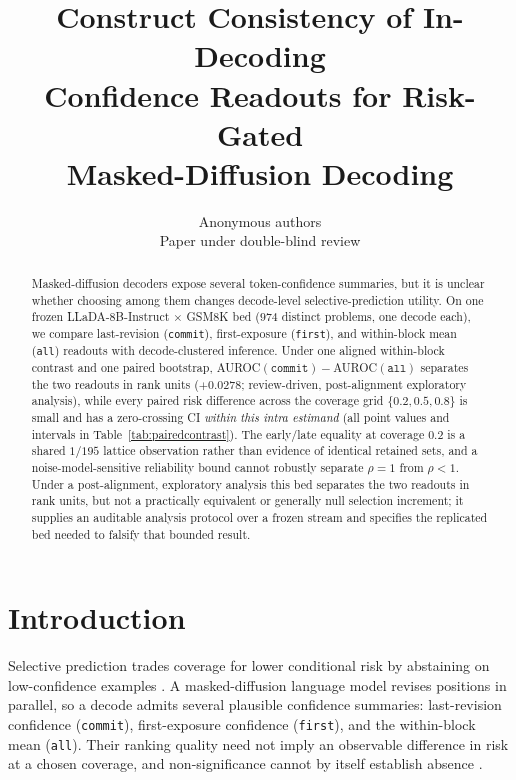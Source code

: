 \documentclass{article}
\title{Construct Consistency of In-Decoding\\
Confidence Readouts for Risk-Gated\\
Masked-Diffusion Decoding}
\author{Anonymous authors\\
Paper under double-blind review}
\begin{document}
\maketitle

\begin{abstract}
Masked-diffusion decoders expose several token-confidence summaries, but it is unclear whether
choosing among them changes decode-level selective-prediction utility.  On one frozen
LLaDA-8B-Instruct $\times$ GSM8K bed ($974$ distinct problems, one decode each), we compare
last-revision (\texttt{commit}), first-exposure (\texttt{first}), and within-block mean
(\texttt{all}) readouts with decode-clustered inference.  Under one aligned within-block contrast
and one paired bootstrap, AUROC$(\texttt{commit})-$AUROC$(\texttt{all})$ separates the two
readouts in rank units ($+0.0278$; review-driven, post-alignment exploratory analysis), while
every paired risk difference across the coverage grid $\{0.2,0.5,0.8\}$ is small and has a
zero-crossing CI \emph{within this intra estimand} (all point values and intervals in
Table~\ref{tab:pairedcontrast}).  The early/late equality at coverage $0.2$ is a shared
$1/195$ lattice observation rather than evidence of identical retained sets, and a
noise-model-sensitive reliability bound cannot robustly separate $\rho=1$ from $\rho<1$.
Under a post-alignment, exploratory analysis this bed separates the two readouts in rank units,
but not a practically equivalent or generally null selection increment; it supplies an
auditable analysis protocol over a frozen stream and specifies the replicated bed needed to
falsify that bounded result.
\end{abstract}

\section{Introduction}
\label{sec:intro}

Selective prediction trades coverage for lower conditional risk by abstaining on low-confidence
examples \citep{chow1970character,elyaniv2010foundations,bartlett2008classification,
geifman2017selective}.  A masked-diffusion language model revises positions in parallel, so a
decode admits several plausible confidence summaries: last-revision confidence
(\texttt{commit}), first-exposure confidence (\texttt{first}), and the within-block mean
(\texttt{all}).  Their ranking quality need not imply an observable difference in risk at a
chosen coverage, and non-significance cannot by itself establish absence
\citep{altman1995absence}.
\end{document}
